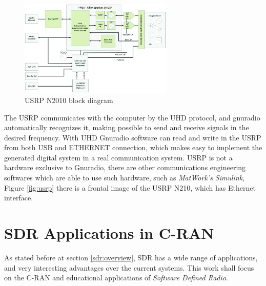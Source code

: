 \begin{figure}[htbp]
    \centering
    \includegraphics[width=0.65\textwidth]{./figures/usrp_bd}
    \caption{ USRP N2010 block diagram
    \label{fig:usrpbd}}
\end{figure}

The USRP communicates with the computer by the UHD protocol, and gnuradio
automatically recognizes it, making possible to send and receive signals in the
desired frequency. With UHD Gnuradio software can read and write in the USRP
from both USB and ETHERNET connection, which makes easy to implement the
generated digital system in a real communication system. USRP is not a hardware
exclusive to Gnuradio, there are other communications engineering softwares
which are able to use such hardware, such as \textit{MatWork's Simulink}, Figure
\ref{fig:usrp} there is a frontal image of the USRP N210, which has Ethernet
interface.


\section{SDR Applications in C-RAN}
\label{sec:sdr_app}

As stated before at section \ref{sdr:overview}, SDR has a wide range of applications,
and very interesting advantages over the current systems. This work shall focus
on the C-RAN and educational applications of \emph{Software Defined Radio}.

